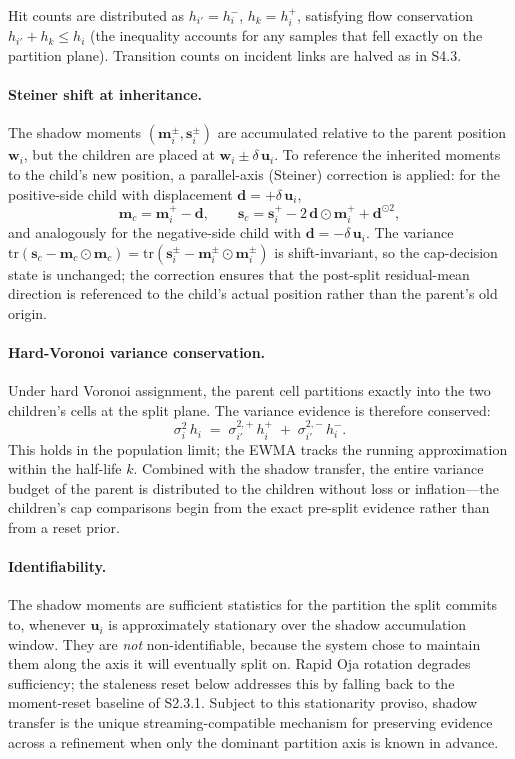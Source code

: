 \documentclass[11pt]{article}
\begin{document}
Hit counts are distributed as $h_{i'}=h_i^-$, $h_k=h_i^+$, satisfying flow conservation $h_{i'}+h_k\le h_i$ (the inequality accounts for any samples that fell exactly on the partition plane). Transition counts on incident links are halved as in S4.3.

\paragraph{Steiner shift at inheritance.}
The shadow moments $(\mathbf m_i^\pm,\mathbf s_i^\pm)$ are accumulated relative to the parent position $\mathbf w_i$, but the children are placed at $\mathbf w_i\pm\delta\,\mathbf u_i$. To reference the inherited moments to the child's new position, a parallel-axis (Steiner) correction is applied: for the positive-side child with displacement $\mathbf d=+\delta\,\mathbf u_i$,
\[
\mathbf m_c=\mathbf m_i^+-\mathbf d,
\qquad
\mathbf s_c=\mathbf s_i^+-2\,\mathbf d\odot\mathbf m_i^++\mathbf d^{\odot 2},
\]
and analogously for the negative-side child with $\mathbf d=-\delta\,\mathbf u_i$. The variance $\mathrm{tr}(\mathbf s_c-\mathbf m_c\odot\mathbf m_c)=\mathrm{tr}(\mathbf s_i^\pm-\mathbf m_i^\pm\odot\mathbf m_i^\pm)$ is shift-invariant, so the cap-decision state is unchanged; the correction ensures that the post-split residual-mean direction is referenced to the child's actual position rather than the parent's old origin.

\paragraph{Hard-Voronoi variance conservation.}
Under hard Voronoi assignment, the parent cell partitions exactly into the two children's cells at the split plane. The variance evidence is therefore conserved:
\[
\sigma_i^2\,h_i
\;=\;
\sigma_{i'}^{2,+}\,h_i^+\;+\;\sigma_{i'}^{2,-}\,h_i^-.
\]
This holds in the population limit; the EWMA tracks the running approximation within the half-life $k$. Combined with the shadow transfer, the entire variance budget of the parent is distributed to the children without loss or inflation---the children's cap comparisons begin from the exact pre-split evidence rather than from a reset prior.

\paragraph{Identifiability.}
The shadow moments are sufficient statistics for the partition the split commits to, whenever $\mathbf u_i$ is approximately stationary over the shadow accumulation window. They are \emph{not} non-identifiable, because the system chose to maintain them along the axis it will eventually split on. Rapid Oja rotation degrades sufficiency; the staleness reset below addresses this by falling back to the moment-reset baseline of S2.3.1. Subject to this stationarity proviso, shadow transfer is the unique streaming-compatible mechanism for preserving evidence across a refinement when only the dominant partition axis is known in advance.
\end{document}
